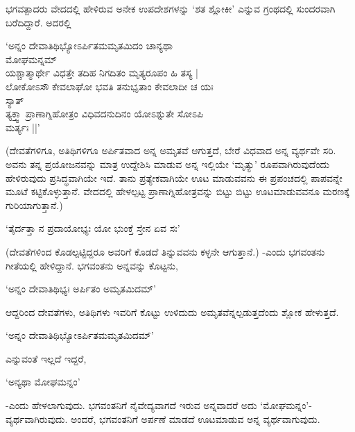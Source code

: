 ಭಗವತ್ಪಾದರು ವೇದದಲ್ಲಿ ಹೇಳಿರುವ ಅನೇಕ ಉಪದೇಶಗಳನ್ನು `ಶತ ಶ್ಲೋಕೀ' ಎನ್ನುವ ಗ್ರಂಥದಲ್ಲಿ ಸುಂದರವಾಗಿ ಬರೆದಿದ್ದಾರೆ. ಅದರಲ್ಲಿ

\begin{shloka}
`ಅನ್ನಂ ದೇವಾತಿಥಿಭ್ಯೋಽರ್ಪಿತಮಮೃತಮಿದಂ ಚಾನ್ಯಥಾ\\
\hspace{5.3cm} ಮೋಘಮನ್ನಮ್\\
ಯಶ್ಚಾತ್ಮಾರ್ಥೇ ವಿಧತ್ತೇ ತದಿಹ ನಿಗದಿತಂ ಮೃತ್ಯರೂಪಂ ಹಿ ತಸ್ಯ |\\
ಲೋಕೋಽಸೌ ಕೇವಲಾಘೋ ಭವತಿ ತನುಭೃತಾಂ ಕೇವಲಾದೀ ಚ ಯಃ\\
\hspace{5.3cm} ಸ್ಯಾತ್\\
ತ್ಯಕ್ತ್ವಾ ಪ್ರಾಣಾಗ್ನಿಹೋತ್ರಂ ವಿಧಿವದನುದಿನಂ ಯೋಽಶ್ನುತೇ ಸೋಽಪಿ\\
\hspace{5.3cm} ಮರ್ತ್ಯಃ ||'
\end{shloka}

(ದೇವತೆಗಳಿಗೂ, ಅತಿಥಿಗಳಿಗೂ ಅರ್ಪಿತವಾದ ಅನ್ನ ಅಮೃತವೆ ಆಗುತ್ತದೆ, ಬೇರೆ ವಿಧವಾದ ಅನ್ನ ವ್ಯರ್ಥವೇ ಸರಿ. ಅವನು ತನ್ನ ಪ್ರಯೋಜನವನ್ನು ಮಾತ್ರ ಉದ್ದೇಶಿಸಿ ಮಾಡುವ ಅನ್ನ ಇಲ್ಲಿಯೇ `ಮೃತ್ಯು' ರೂಪವಾಗಿರುವುದೆಂದು ಹೇಳಿರುವುದು ಪ್ರಸಿದ್ಧವಾಗಿಯೇ ಇದೆ. ತಾನು ಪ್ರತ್ಯೇಕವಾಗಿಯೇ ಊಟ ಮಾಡುವವನು ಈ ಪ್ರಪಂಚದಲ್ಲಿ ಪಾಪವನ್ನೇ ಮೂಟೆ ಕಟ್ಟಿಕೊಳ್ಳುತ್ತಾನೆ. ವೇದದಲ್ಲಿ ಹೇಳಲ್ಪಟ್ಟ ಪ್ರಾಣಾಗ್ನಿಹೋತ್ರವನ್ನು ಬಿಟ್ಟು ಬಿಟ್ಟು ಊಟಮಾಡುವವನೂ ಮರಣಕ್ಕೆ ಗುರಿಯಾಗುತ್ತಾನೆ.)

\begin{shloka}
`ತೈರ್ದತ್ತಾ ನ ಪ್ರದಾಯೋಭ್ಯಃ ಯೋ ಭುಂಕ್ತೆ ಸ್ತೇನ ಏವ ಸಃ'
\end{shloka}

(ದೇವತೆಗಳಿಂದ ಕೊಡಲ್ಪಟ್ಟಿದ್ದರೂ ಅವರಿಗೆ ಕೊಡದೆ ತಿನ್ನುವವನು ಕಳ್ಳನೇ ಆಗುತ್ತಾನೆ.) -ಎಂದು ಭಗವಂತನು ಗೀತೆಯಲ್ಲಿ ಹೇಳಿದ್ದಾನೆ. ಭಗವಂತನು ಅನ್ನವನ್ನು ಕೊಟ್ಟನು,

\begin{shloka}
`ಅನ್ನಂ ದೇವಾತಿಥಿಭ್ಯಃ ಅರ್ಪಿತಂ ಅಮೃತಮಿದಮ್'
\end{shloka}

ಆದ್ದರಿಂದ ದೇವತೆಗಳು, ಅತಿಥಿಗಳು ಇವರಿಗೆ ಕೊಟ್ಟು ಉಳಿದುದು ಅಮೃತವೆನ್ನಲ್ಪಡುತ್ತದೆಂದು ಶ್ಲೋಕ ಹೇಳುತ್ತದೆ.

\begin{shloka}
`ಅನ್ನಂ ದೇವಾತಿಥಿಭ್ಯೋಽರ್ಪಿತಮಮೃತಮಿದಮ್'
\end{shloka}

ಎನ್ನುವಂತೆ ಇಲ್ಲದೆ ಇದ್ದರೆ,

\begin{shloka}
`ಅನ್ಯಥಾ ಮೋಘಮನ್ನಂ'
\end{shloka}

-ಎಂದು ಹೇಳಲಾಗುವುದು. ಭಗವಂತನಿಗೆ ನೈವೇದ್ಯವಾಗದೆ ಇರುವ ಅನ್ನವಾದರೆ ಅದು `ಮೋಘಮನ್ನಂ'-ವ್ಯರ್ಥವಾಗಿರುವುದು. ಅಂದರೆ, ಭಗವಂತನಿಗೆ ಅರ್ಪಣೆ ಮಾಡದೆ ಊಟಮಾಡುವ ಅನ್ನ ವ್ಯರ್ಥವಾಗುವುದು.


